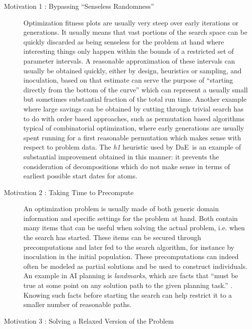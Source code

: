 \documentclass[english]{DESCARWINreport}
\newcommand{\DAE}{{\sc DaE}}
\begin{document}
\begin{description}

\item[Motivation 1 : Bypassing ``Senseless Randomness''] 

Optimization fitness plots are usually very steep over early iterations or generations. It usually means that vast portions of the search space can be quickly discarded as being senseless for the problem at hand where interesting things only happen within the bounds of a restricted set of parameter intervals. A reasonable approximation of these intervals can usually be obtained quickly, either by design, heuristics or sampling, and inoculation, based on that estimate can serve the purpose of ``starting directly from the bottom of the curve'' which can represent a usually small but sometimes substantial fraction of the total run time. Another example where large savings can be obtained by cutting through trivial search has to do with order based approaches, such as permutation based algorithms typical of combinatorial optimization, where early generations are usually spent running for a first reasonable permutation which makes sense with respect to problem data. The \emph{h1} heuristic used by \DAE\ is an example of substantial improvement obtained in this manner: it prevents the consideration of decompositions which do not make sense in terms of earliest possible start dates for atoms.

\item[Motivation 2 : Taking Time to Precompute]

An optimization problem is usually made of both generic domain information and specific settings for the problem at hand. Both contain many items that can be useful when solving the actual problem, i.e. when the search has started. These items can be secured through precomputations and later fed to the search algorithm, for instance by inoculation in the initial population. These precomputations can indeed often be modeled as partial solutions and be used to construct individuals. An example in AI planning is \emph{landmarks}, which are facts that ``must be true at some point on any solution path to the given planning task.'' \cite{DBLP:journals/corr/abs-1107-0052}. Knowing such facts before starting the search can help restrict it to a smaller number of reasonable paths.

\item[Motivation 3 : Solving a Relaxed Version of the Problem]


\end{description}
\end{document}
